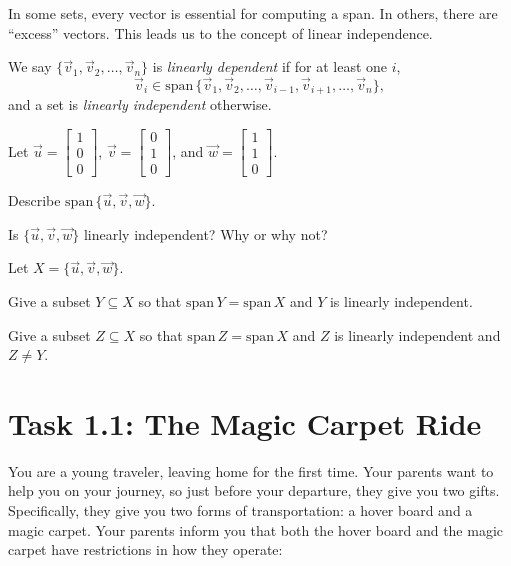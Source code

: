 \documentclass[14pt]{problemset}
\renewcommand{\span}{\mathrm{span}\,}
\newcommand{\Span}{\mathrm{span}\,}
\newcommand{\mat}[1]{\begin{bmatrix}#1\end{bmatrix}}
\begin{document}
	In some sets, every vector is essential for computing a span.  In others,
	there are ``excess'' vectors.  This leads us to the concept of 
	linear independence.

	\begin{definition}
		We say $\{\vec v_1,\vec v_2,\ldots,\vec v_n\}$ is
		\emph{linearly dependent} if for at least one $i$,
		\[
			\vec v_i\in\span\{\vec v_1,\vec v_2,\ldots,\vec v_{i-1},
			\vec v_{i+1},\ldots,\vec v_n\},
		\]
		and a set is \emph{linearly independent} otherwise.
	\end{definition}

	\question
		Let $\vec u=\mat{1\\0\\0}$, $\vec v=\mat{0\\1\\0}$, and $\vec w=\mat{1\\1\\0}$.
	\begin{parts}
		\item Describe $\Span\{\vec u,\vec v,\vec w\}$.
		\item Is $\{\vec u,\vec v,\vec w\}$ linearly independent?  Why or why not?
	\end{parts}

	Let $X=\{\vec u,\vec v,\vec w\}$.

	\begin{parts}[resume]
		\item Give a subset $Y\subseteq X$ so that $\Span Y=\Span X$ and $Y$ is
		linearly independent.
		\item Give a subset $Z\subseteq X$ so that $\Span Z=\Span X$ and $Z$ is
		linearly independent and $Z\neq Y$.
	\end{parts}
	
\newpage
\pagestyle{iola}
\section*{Task 1.1: The Magic Carpet Ride}

You are a young traveler, leaving home for the first time. Your parents
want to help you on your journey, so just before your departure, they give
you two gifts. Specifically, they give you two forms of transportation:
a hover board and a magic carpet. Your parents inform you that both the
hover board and the magic carpet have restrictions in how they operate:
\end{document}
